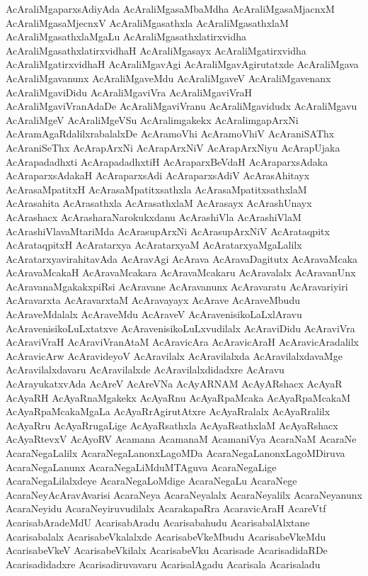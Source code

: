 {AcAraliMgaparxsAdiyAda
AcAraliMgasaMbaMdha
AcAraliMgasaMjacnxM
AcAraliMgasaMjecnxV
AcAraliMgasathxla
AcAraliMgasathxlaM
AcAraliMgasathxlaMgaLu
AcAraliMgasathxlatirxvidha
AcAraliMgasathxlatirxvidhaH
AcAraliMgasayx
AcAraliMgatirxvidha
AcAraliMgatirxvidhaH
AcAraliMgavAgi
AcAraliMgavAgirutatxde
AcAraliMgava
AcAraliMgavanunx
AcAraliMgaveMdu
AcAraliMgaveV
AcAraliMgavenanx
AcAraliMgaviDidu
AcAraliMgaviVra
AcAraliMgaviVraH
AcAraliMgaviVranAdaDe
AcAraliMgaviVranu
AcAraliMgavidudx
AcAraliMgavu
AcAraliMgeV
AcAraliMgeVSu
AcAralimgakekx
AcAralimgapArxNi
AcAramAgaRdalilxrabalalxDe
AcAramoVhi
AcAramoVhiV
AcAraniSAThx
AcAraniSeThx
AcArapArxNi
AcArapArxNiV
AcArapArxNiyu
AcArapUjaka
AcArapadadhxti
AcArapadadhxtiH
AcAraparxBeVdaH
AcAraparxsAdaka
AcAraparxsAdakaH
AcAraparxsAdi
AcAraparxsAdiV
AcArasAhitayx
AcArasaMpatitxH
AcArasaMpatitxsathxla
AcArasaMpatitxsathxlaM
AcArasahita
AcArasathxla
AcArasathxlaM
AcArasayx
AcArashUnayx
AcArashacx
AcArasharaNarokukxdanu
AcArashiVla
AcArashiVlaM
AcArashiVlavaMtariMda
AcArasupArxNi
AcArasupArxNiV
AcArataqpitx
AcArataqpitxH
AcAratarxya
AcAratarxyaM
AcAratarxyaMgaLalilx
AcAratarxyavirahitavAda
AcAravAgi
AcArava
AcAravaDagitutx
AcAravaMcaka
AcAravaMcakaH
AcAravaMcakara
AcAravaMcakaru
AcAravalalx
AcAravanUnx
AcAravanaMgakakxpiRsi
AcAravane
AcAravanunx
AcAravaratu
AcAravariyiri
AcAravarxta
AcAravarxtaM
AcAravayayx
AcArave
AcAraveMbudu
AcAraveMdalalx
AcAraveMdu
AcAraveV
AcAravenisikoLaLxlAravu
AcAravenisikoLuLxtatxve
AcAravenisikoLuLxvudilalx
AcAraviDidu
AcAraviVra
AcAraviVraH
AcAraviVranAtaM
AcAravicAra
AcAravicAraH
AcAravicAradalilx
AcAravicArw
AcAravideyoV
AcAravilalx
AcAravilalxda
AcAravilalxdavaMge
AcAravilalxdavaru
AcAravilalxde
AcAravilalxdidadxre
AcAravu
AcArayukatxvAda
AcAreV
AcAreVNa
AcAyARNAM
AcAyARshacx
AcAyaR
AcAyaRH
AcAyaRnaMgakekx
AcAyaRnu
AcAyaRpaMcaka
AcAyaRpaMcakaM
AcAyaRpaMcakaMgaLa
AcAyaRrAgirutAtxre
AcAyaRralalx
AcAyaRralilx
AcAyaRru
AcAyaRrugaLige
AcAyaRsathxla
AcAyaRsathxlaM
AcAyaRshacx
AcAyaRtevxV
AcAyoRV
Acamana
AcamanaM
AcamaniVya
AcaraNaM
AcaraNe
AcaraNegaLalilx
AcaraNegaLanonxLagoMDa
AcaraNegaLanonxLagoMDiruva
AcaraNegaLanunx
AcaraNegaLiMduMTAguva
AcaraNegaLige
AcaraNegaLilalxdeye
AcaraNegaLoMdige
AcaraNegaLu
AcaraNege
AcaraNeyAcAravAvarisi
AcaraNeya
AcaraNeyalalx
AcaraNeyalilx
AcaraNeyanunx
AcaraNeyidu
AcaraNeyiruvudilalx
AcarakapaRra
AcaravicAraH
AcareVtf
AcarisabAradeMdU
AcarisabAradu
Acarisabahudu
AcarisabalAlxtane
Acarisabalalx
AcarisabeVkalalxde
AcarisabeVkeMbudu
AcarisabeVkeMdu
AcarisabeVkeV
AcarisabeVkilalx
AcarisabeVku
Acarisade
AcarisadidaRDe
Acarisadidadxre
Acarisadiruvavaru
AcarisalAgadu
Acarisala
Acarisaladu
}
